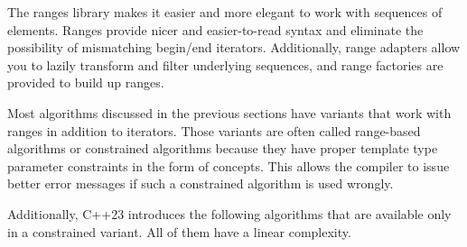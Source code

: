The ranges library makes it easier and more elegant to work with sequences of elements. Ranges provide nicer and easier-to-read syntax and eliminate the possibility of mismatching begin/end iterators. Additionally, range adapters allow you to lazily transform and filter underlying sequences, and range factories are provided to build up ranges.

Most algorithms discussed in the previous sections have variants that work with ranges in addition to iterators. Those variants are often called range-based algorithms or constrained algorithms because they have proper template type parameter constraints in the form of concepts. This allows the compiler to issue better error messages if such a constrained algorithm is used wrongly.

Additionally, C++23 introduces the following algorithms that are available only in a constrained variant. All of them have a linear complexity.


